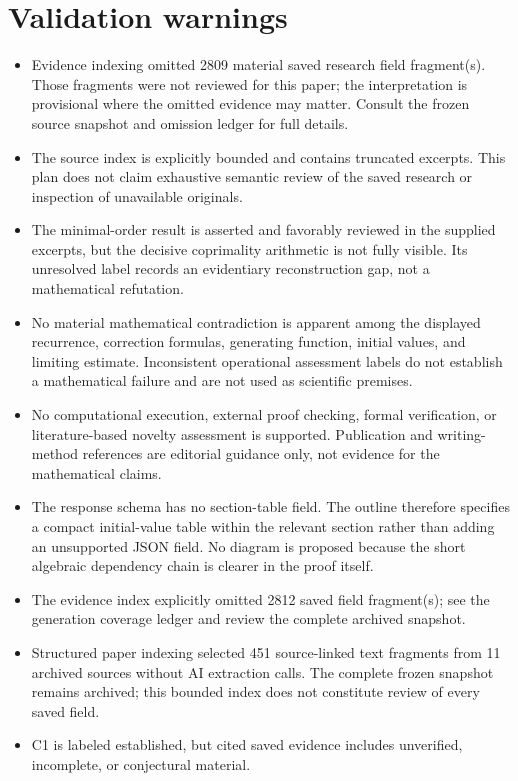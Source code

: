 \documentclass[11pt]{article}
\begin{document}
\section*{Validation warnings}
\begin{itemize}
\item Evidence indexing omitted 2809 material saved research field fragment(s). Those fragments were not reviewed for this paper; the interpretation is provisional where the omitted evidence may matter. Consult the frozen source snapshot and omission ledger for full details.
\item The source index is explicitly bounded and contains truncated excerpts. This plan does not claim exhaustive semantic review of the saved research or inspection of unavailable originals.
\item The minimal-order result is asserted and favorably reviewed in the supplied excerpts, but the decisive coprimality arithmetic is not fully visible. Its unresolved label records an evidentiary reconstruction gap, not a mathematical refutation.
\item No material mathematical contradiction is apparent among the displayed recurrence, correction formulas, generating function, initial values, and limiting estimate. Inconsistent operational assessment labels do not establish a mathematical failure and are not used as scientific premises.
\item No computational execution, external proof checking, formal verification, or literature-based novelty assessment is supported. Publication and writing-method references are editorial guidance only, not evidence for the mathematical claims.
\item The response schema has no section-table field. The outline therefore specifies a compact initial-value table within the relevant section rather than adding an unsupported JSON field. No diagram is proposed because the short algebraic dependency chain is clearer in the proof itself.
\item The evidence index explicitly omitted 2812 saved field fragment(s); see the generation coverage ledger and review the complete archived snapshot.
\item Structured paper indexing selected 451 source-linked text fragments from 11 archived sources without AI extraction calls. The complete frozen snapshot remains archived; this bounded index does not constitute review of every saved field.
\item C1 is labeled established, but cited saved evidence includes unverified, incomplete, or conjectural material.

\end{itemize}
\end{document}
